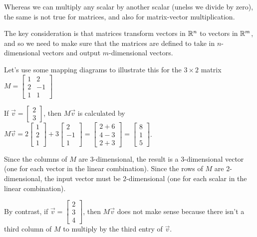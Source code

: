 \documentclass{ximera}
\begin{document}
    \begin{example}

        Whereas we can multiply any scalar by another scalar (unelss we divide by zero), the same is not true for matrices, and also for matrix-vector multiplication.

        The key consideration is that matrices transform vectors in $\mathbb{R}^n$ to vectors in $\mathbb{R}^m$, and so we need to make sure that the matrices are defined to take in $n$-dimensional vectors and output $m$-dimensional vectors.

        Let's use some mapping diagrams to illustrate this for the $3\times 2$ matrix \(M=\begin{bmatrix} 1 & 2 \\ 2&-1 \\ 1 & 1\end{bmatrix}\)

        If $\vec{v}= \begin{bmatrix} 2 \\ 3 \end{bmatrix}$, then $M\vec{v}$ is calculated by $M\vec{v}=2 \begin{bmatrix} 1 \\ 2 \\ 1 \end{bmatrix}+3 \begin{bmatrix} 2 \\ -1 \\ 1 \end{bmatrix}=\begin{bmatrix} 2+6 \\ 4-3 \\ 2+3 \end{bmatrix}=\begin{bmatrix} 8 \\ 1 \\ 5 \end{bmatrix}$.

        Since the columns of $M$ are $3$-dimensional, the result is a $3$-dimensional vector (one for each vector in the linear combination). Since the rows of $M$ are $2$-dimensional, the input vector must be $2$-dimensional (one for each scalar in the linear combination).

        By contrast, if $\vec{v}= \begin{bmatrix} 2 \\ 3 \\ 4 \end{bmatrix}$, then $M\vec{v}$ does not make sense because there isn't a third column of $M$ to multiply by the third entry of $\vec{v}$.


\end{example}
\end{document}
